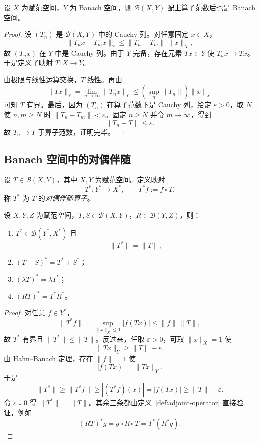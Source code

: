 \begin{proposition}\label{prop:operator-space-banach}
设 $X$ 为赋范空间，$Y$ 为 Banach 空间，则 $\mathcal B(X,Y)$ 配上算子范数后也是 Banach 空间。
\end{proposition}

\begin{proof}
设 $(T_n)$ 是 $\mathcal B(X,Y)$ 中的 Cauchy 列。对任意固定 $x\in X$，
\[
\|T_nx-T_mx\|_Y\le \|T_n-T_m\|\,\|x\|_X,
\]
故 $(T_nx)$ 在 $Y$ 中是 Cauchy 列。由于 $Y$ 完备，存在元素 $Tx\in Y$ 使 $T_nx\to Tx$。于是定义了映射 $T\colon X\to Y$。

由极限与线性运算交换，$T$ 线性。再由
\[
\|Tx\|_Y=\lim_{n\to\infty}\|T_nx\|_Y
\le \left(\sup_n \|T_n\|\right)\|x\|_X
\]
可知 $T$ 有界。最后，因为 $(T_n)$ 在算子范数下是 Cauchy 列，给定 $\varepsilon>0$，取 $N$ 使 $n,m\ge N$ 时 $\|T_n-T_m\|<\varepsilon$。固定 $n\ge N$ 并令 $m\to\infty$，得到
\[
\|T_n-T\|\le \varepsilon.
\]
故 $T_n\to T$ 于算子范数，证明完毕。
\end{proof}

\subsection{Banach 空间中的对偶伴随}

\begin{definition}[伴随算子]\label{def:adjoint-operator}
设 $T\in \mathcal B(X,Y)$，其中 $X,Y$ 为赋范空间。定义映射
\[
T^\ast\colon Y^\ast\to X^\ast,\qquad T^\ast f:=f\circ T.
\]
称 $T^\ast$ 为 $T$ 的\emph{对偶伴随算子}。
\end{definition}

\begin{proposition}[伴随算子的基本性质]\label{prop:adjoint-basic-properties}
设 $X,Y,Z$ 为赋范空间，$T,S\in \mathcal B(X,Y)$，$R\in \mathcal B(Y,Z)$，则：
\begin{enumerate}
  \item $T^\ast\in \mathcal B(Y^\ast,X^\ast)$ 且
  \[
  \|T^\ast\|=\|T\| ;
  \]
  \item $(T+S)^\ast=T^\ast+S^\ast$；
  \item $(\lambda T)^\ast=\lambda T^\ast$；
  \item $(RT)^\ast=T^\ast R^\ast$。
\end{enumerate}
\end{proposition}

\begin{proof}
对任意 $f\in Y^\ast$，
\[
\|T^\ast f\|
=\sup_{\|x\|_X\le 1}|f(Tx)|
\le \|f\|\,\|T\|,
\]
故 $T^\ast$ 有界且 $\|T^\ast\|\le \|T\|$。反过来，任取 $\varepsilon>0$，可取 $\|x\|_X=1$ 使
\[
\|Tx\|_Y\ge \|T\|-\varepsilon.
\]
由 Hahn--Banach 定理，存在 $\|f\|=1$ 使
\[
|f(Tx)|=\|Tx\|_Y.
\]
于是
\[
\|T^\ast\|
\ge \|T^\ast f\|
\ge |(T^\ast f)(x)|
=|f(Tx)|
\ge \|T\|-\varepsilon.
\]
令 $\varepsilon\downarrow 0$ 得 $\|T^\ast\|=\|T\|$。其余三条都由定义~\ref{def:adjoint-operator} 直接验证，例如
\[
(RT)^\ast g=g\circ R\circ T=T^\ast(R^\ast g).
\]
\end{proof}

